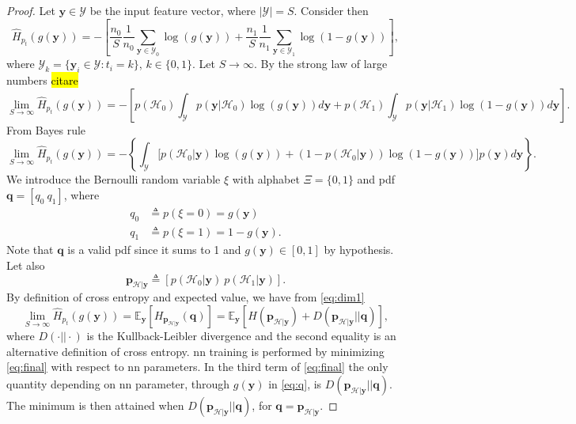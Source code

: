 \documentclass[conference,draftcls,onecolumn]{IEEEtran}
\newcommand{\cross}[2]{H_{#1}(#2)}
\newcommand{\hatcross}[2]{\hat{H}_{#1}(#2)}
\newcommand{\gy}{g(\bm y)}
\newcommand{\E}[1]{\mathbb{E}_{\bm y}\left[#1\right]}
\begin{document}
\begin{proof}
Let $\bm y \in \mathcal{Y}$ be the input feature vector, where $|\mathcal{Y}|=S$. Consider then 
\begin{equation}
	\hatcross{p_t}{\gy} = - \left[ \frac{n_0}{S} \frac{1}{n_0} \sum_{\bm y \in \mathcal{Y}_0} \log(\gy) 
		+ \frac{n_1}{S} \frac{1}{n_1} \sum_{\bm y \in \mathcal{Y}_1} \log(1-\gy) \right],	
\end{equation}
where $\mathcal{Y}_k = \{\bm y_i \in \mathcal{Y} : t_i = k\}$, $k \in \{0,1\}$.
Let $S \to \infty$. By the strong law of large numbers \hl{citare}
\begin{equation}
	\lim_{S \to \infty}	\hatcross{p_t}{\gy} = - \left[ p(\mathcal{H}_0) \int_{\mathcal{Y}} p(\bm y|\mathcal{H}_0) \log (\gy) d\bm y + 
		 p(\mathcal{H}_1) \int_{\mathcal{Y}} p(\bm y|\mathcal{H}_1) \log (1-\gy) d\bm y \right]. 
\end{equation}
From Bayes rule
\begin{equation}
\label{eq:dim1}
\lim_{S \to \infty}	\hatcross{p_t}{\gy} = - \left\{ \int_{\mathcal{Y}} \bigl[ p(\mathcal{H}_0|\bm y) \log(\gy) + 
	(1-p(\mathcal{H}_0|\bm y)) \log(1-\gy)\bigr] p(\bm y)   d\bm y \right\}. 		
\end{equation}
We introduce the Bernoulli random variable $\xi$ with alphabet $\Xi = \{0,1\}$ and \ac{pdf} $\bm q = [q_0 \ q_1]$, where
\begin{subequations}
\label{eq:q}
\begin{align}
	q_0 &\triangleq p(\xi=0)=\gy \\
	q_1 &\triangleq p(\xi=1)=1-\gy.
\end{align}
\end{subequations}
Note that $\bm q$ is a valid \ac{pdf} since it sums to 1 and $\gy \in [0,1]$ by hypothesis. Let also 
\begin{equation}
	\bm p_{\mathcal{H}|\bm y} \triangleq [p(\mathcal{H}_0|\bm y)\ p(\mathcal{H}_1|\bm y)].	
\end{equation}
By definition of cross entropy and expected value, we have from \eqref{eq:dim1}
\begin{equation}
\label{eq:final}
	\lim_{S \to \infty}	\hatcross{p_t}{\gy} =	\E{ \cross{\bm p_{\mathcal{H}|\bm y}}{\bm q}} = 
		\E{H (\bm p_{\mathcal{H}|\bm y}) + D(\bm p_{\mathcal{H}|\bm y}||\bm q)},
\end{equation}
where $D(\cdot||\cdot)$ is the Kullback-Leibler divergence and the second equality is an alternative definition of cross entropy.
\ac{nn} training is performed by minimizing \eqref{eq:final} with respect to \ac{nn} parameters. In the third term of \eqref{eq:final} the only quantity depending on \ac{nn} parameter, through $\gy$ in \eqref{eq:q}, is $D(\bm p_{\mathcal{H}|\bm y}||\bm q)$. The minimum is then attained when $D(\bm p_{\mathcal{H}|\bm y}||\bm q)$, for $\bm q = \bm p_{\mathcal{H}|\bm y}$.
\end{proof}
\end{document}
